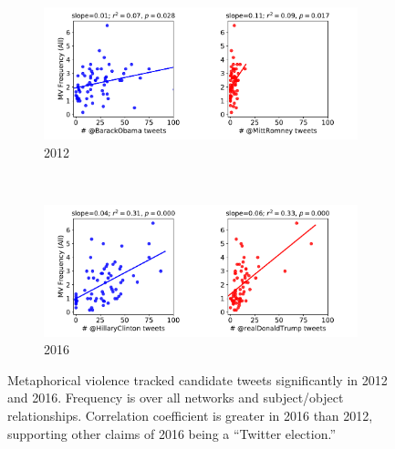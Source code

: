 \begin{figure}[h]
  \centering
    \begin{subfigure}{0.9\linewidth}
      \centering
      \includegraphics[width=\textwidth]{Figures/2012-all.pdf}
      \caption{2012}
      \label{fig:2012-all-reg}
    \end{subfigure} \\[2em]
    \begin{subfigure}{0.9\linewidth}
      \centering
      \includegraphics[width=\textwidth]{Figures/2016-all.pdf}
      \caption{2016}
      \label{fig:2012-all-reg}
    \end{subfigure}
  \caption{Metaphorical violence tracked candidate tweets significantly in 2012 and
    2016. Frequency is over all networks and subject/object relationships.
    Correlation coefficient is greater in 2016 than 2012, supporting other 
    claims of 2016 being a ``Twitter election.''
  }
  \label{fig:regressions-all}
\end{figure}


